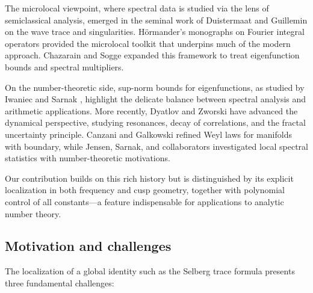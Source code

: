 The microlocal viewpoint, where spectral data is studied via the lens of semiclassical 
analysis, emerged in the seminal work of Duistermaat and Guillemin 
\cite{duistermaatguillemin1975} on the wave trace and singularities. Hörmander’s 
monographs on Fourier integral operators \cite{hormander1994III} provided the 
microlocal toolkit that underpins much of the modern approach. Chazarain 
\cite{chazarain1974} and Sogge \cite{sogge1993,sogge2017} expanded this framework to 
treat eigenfunction bounds and spectral multipliers. 

On the number-theoretic side, sup-norm bounds for eigenfunctions, as studied by Iwaniec 
and Sarnak \cite{iwaniec1995}, highlight the delicate balance between spectral analysis 
and arithmetic applications. More recently, Dyatlov and Zworski 
\cite{dyatlov2018,dyatlov2019,zworski2012} have advanced the dynamical perspective, 
studying resonances, decay of correlations, and the fractal uncertainty principle. 
Canzani and Galkowski \cite{canzani2019} refined Weyl laws for manifolds with boundary, 
while Jensen, Sarnak, and collaborators \cite{jensen2021,sarnak2019} investigated local 
spectral statistics with number-theoretic motivations. 

Our contribution builds on this rich history but is distinguished by its explicit 
localization in both frequency and cusp geometry, together with polynomial control of all 
constants—a feature indispensable for applications to analytic number theory.

\subsection{Motivation and challenges}\label{subsec:difficulties}

The localization of a global identity such as the Selberg trace formula presents three 
fundamental challenges:

